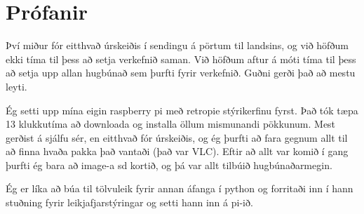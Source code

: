 \section{Prófanir}

Því miður fór eitthvað úrskeiðis í sendingu á pörtum til landsins, og við höfðum ekki tíma til þess að setja verkefnið saman. Við höfðum aftur á móti tíma til þess að setja upp allan hugbúnað sem þurfti fyrir verkefnið. Guðni gerði það að mestu leyti.

Ég setti upp mína eigin raspberry pi með retropie stýrikerfinu fyrst. Það tók tæpa 13 klukkutíma að downloada og installa öllum mismunandi pökkunum. Mest gerðist á sjálfu sér, en eitthvað fór úrskeiðis, og ég þurfti að fara gegnum allt til að finna hvaða pakka það vantaði (það var VLC). Eftir að allt var komið í gang þurfti ég bara að image-a sd kortið, og þá var allt tilbúið hugbúnaðarmegin.

Ég er líka að búa til tölvuleik fyrir annan áfanga í python og forritaði inn í hann stuðning fyrir leikjafjarstýringar og setti hann inn á pi-ið.